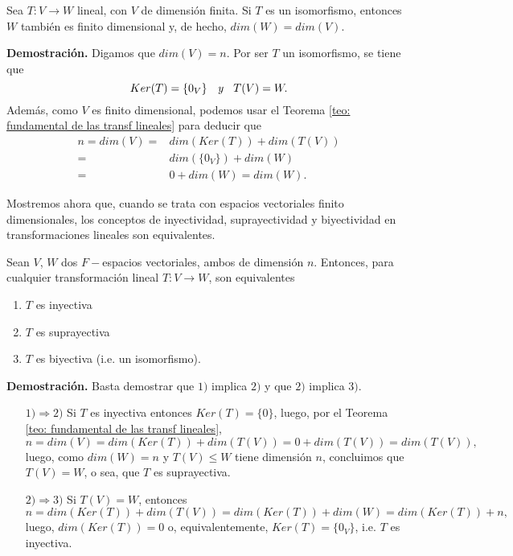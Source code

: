 \begin{prop}
	\label{prop: isomorfo implica misma dimension}
Sea $T: V \longrightarrow W$ lineal, con $V$
de dimensión finita. Si $T$ es un isomorfismo, entonces
$W$ también es finito dimensional y, de hecho,
$dim(W) = dim(V)$.
\end{prop}
\noindent
\textbf{Demostración.}
Digamos que $dim(V)=n$.
Por ser $T$ un isomorfismo, se tiene que
\[
Ker(T) = \{ 0_{V} \} \hspace{0.2cm} \textit{ y }
\hspace{0.2cm} T(V) = W.
\]
Además, como $V$ es finito dimensional, podemos usar el Teorema
\ref{teo: fundamental de las transf lineales}
para deducir que
\begin{align*}
n = dim(V) = & dim(Ker(T)) + dim(T(V)) \\
= & dim(\{ 0_{V} \}) + dim(W) \\
= & 0 + dim(W) = dim(W).
\end{align*} 
\QEDB
\vspace{0.2cm}
 
 
 Mostremos ahora que, cuando se trata con espacios vectoriales finito
 dimensionales, los conceptos de inyectividad, suprayectividad
 y biyectividad en transformaciones lineales son equivalentes.
\begin{teo}
	\label{teo: inyectiva sii supra sii biyect en dim finita}
Sean $V$, $W$ dos $F-$espacios vectoriales, ambos de dimensión
$n$. Entonces, para cualquier transformación lineal
$T: V \longrightarrow W$, son equivalentes
\begin{enumerate}
	\item $T$ es inyectiva
	\item $T$ es suprayectiva
	\item $T$ es biyectiva (i.e. un isomorfismo).
\end{enumerate}
\end{teo}
\noindent
\textbf{Demostración.}
Basta demostrar que $1)$ implica $2)$ y que
$2)$ implica $3)$.
\begin{itemize}
	\item[$1) \Rightarrow 2)$] Si $T$ es inyectiva entonces
	$Ker(T) = \{ 0 \}$, luego, por el Teorema 
	\ref{teo: fundamental de las transf lineales},
	\[
	n = dim(V) = dim(Ker(T)) + dim(T(V)) = 0 + dim(T(V)) =
	dim(T(V)),
	\]
	luego, como $dim(W) = n$ y $T(V) \leq W$ tiene dimensión $n$,
	concluimos que $T(V) = W$, o sea, que $T$ es suprayectiva.
	\item[$2) \Rightarrow 3)$] Si $T(V) = W$, entonces
	\[
	n = dim(Ker(T)) + dim(T(V)) = dim(Ker(T)) + dim(W)
	= dim(Ker(T)) + n,
	\]
	luego, $dim(Ker(T)) = 0$ o, equivalentemente, 
	$Ker(T) = \{ 0_{V} \}$, i.e. $T$ es inyectiva.
\end{itemize}
\QEDB
\vspace{0.2cm}

